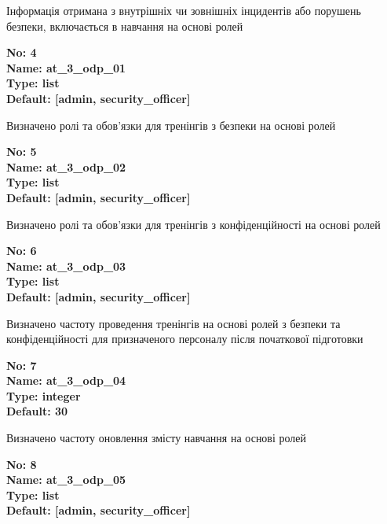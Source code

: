 \documentclass{article}
\begin{document}
{\footnotesize Інформація отримана з внутрішніх чи зовнішніх інцидентів або порушень безпеки, включається в навчання на основі ролей}


{\footnotesize\bfseries
No: 4\\
Name: at\_\allowbreak{}3\_\allowbreak{}odp\_\allowbreak{}01\\
Type: list\\
Default: [\textquotedbl{}admin\textquotedbl{}, \textquotedbl{}security\_\allowbreak{}officer\textquotedbl{}]
}

{\footnotesize Визначено ролі та обов'язки для тренінгів з безпеки на основі ролей}


{\footnotesize\bfseries
No: 5\\
Name: at\_\allowbreak{}3\_\allowbreak{}odp\_\allowbreak{}02\\
Type: list\\
Default: [\textquotedbl{}admin\textquotedbl{}, \textquotedbl{}security\_\allowbreak{}officer\textquotedbl{}]
}

{\footnotesize Визначено ролі та обов'язки для тренінгів з конфіденційності на основі ролей}


{\footnotesize\bfseries
No: 6\\
Name: at\_\allowbreak{}3\_\allowbreak{}odp\_\allowbreak{}03\\
Type: list\\
Default: [\textquotedbl{}admin\textquotedbl{}, \textquotedbl{}security\_\allowbreak{}officer\textquotedbl{}]
}

{\footnotesize Визначено частоту проведення тренінгів на основі ролей з безпеки та конфіденційності для призначеного персоналу після початкової підготовки}


{\footnotesize\bfseries
No: 7\\
Name: at\_\allowbreak{}3\_\allowbreak{}odp\_\allowbreak{}04\\
Type: integer\\
Default: 30
}

{\footnotesize Визначено частоту оновлення змісту навчання на основі ролей}


{\footnotesize\bfseries
No: 8\\
Name: at\_\allowbreak{}3\_\allowbreak{}odp\_\allowbreak{}05\\
Type: list\\
Default: [\textquotedbl{}admin\textquotedbl{}, \textquotedbl{}security\_\allowbreak{}officer\textquotedbl{}]
}
\end{document}
